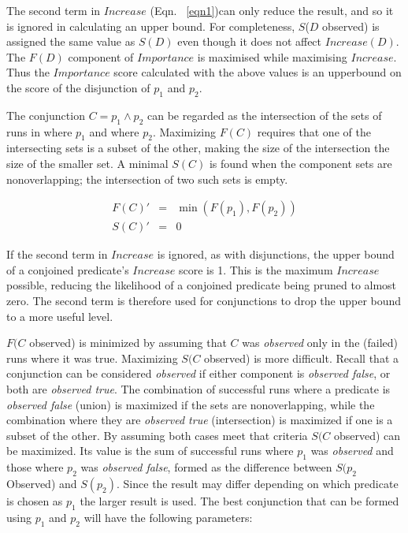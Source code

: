 The second term in $Increase$ (Eqn. ~\ref{eqn1})can only reduce the result, and so it is ignored in calculating an upper bound.  For completeness, $S$($D$ observed) is assigned the same value as $S(D)$ even though it does not affect $Increase(D)$.  The $F(D)$ component of $Importance$ is maximised while maximising $Increase$.  Thus the $Importance$ score calculated with the above values is an upperbound on the score of the disjunction of $p_1$ and $p_2$.

The conjunction $C = p_1 \wedge p_2$ can be regarded as the intersection of the sets of runs in where $p_1$ and where $p_2$.  Maximizing $F(C)$ requires that one of the intersecting sets is a subset of the other, making the size of the intersection the size of the smaller set.  A minimal $S(C)$ is found when the component sets are nonoverlapping; the intersection of two such sets is empty.

\begin{eqnarray}
 \nonumber %
  F(C)' &=&  \min(F(p_1),F(p_2)) \\
 \nonumber
  S(C)' &=& 0
\end{eqnarray}

If the second term in $Increase$ is ignored, as with disjunctions, the upper bound of a conjoined predicate's $Increase$ score is 1.  This is the maximum $Increase$ possible, reducing the likelihood of a conjoined predicate being pruned to almost zero.  The second term is therefore used for conjunctions to drop the upper bound to a more useful level.

$F(C$ observed) is minimized by assuming that $C$ was \textit{observed} only in the (failed) runs where it was true.  Maximizing $S(C$ observed) is more difficult.  Recall that a conjunction can be considered \textit{observed} if either component is \textit{observed false}, or both are \textit{observed true}.  The combination of successful runs where a predicate is \textit{observed false} (union) is maximized if the sets are nonoverlapping, while the combination where they are \textit{observed true} (intersection) is maximized if one is a subset of the other.  By assuming both cases meet that criteria $S(C$ observed) can be maximized.  Its value is the sum of successful runs where $p_1$ was \textit{observed} and those where $p_2$ was \textit{observed false}, formed as the difference between $S(p_2$  Observed) and $S(p_2)$.  Since the result may differ depending on which predicate is chosen as $p_1$ the larger result is used.  The best conjunction that can be formed using $p_1$ and $p_2$ will have the following parameters:

